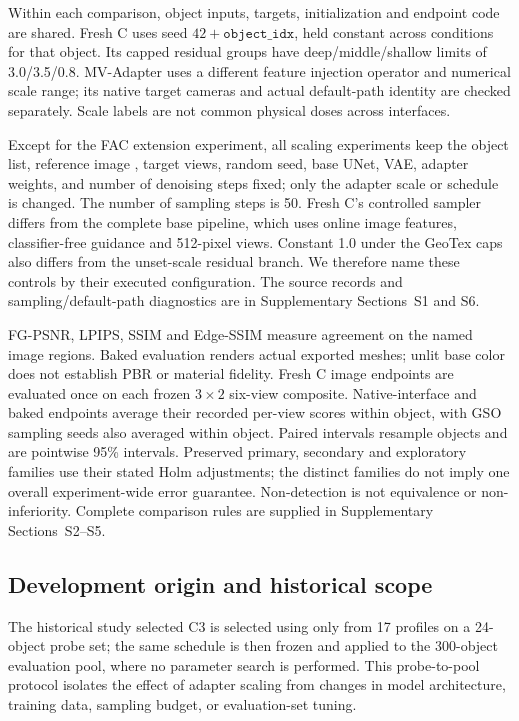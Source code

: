 \documentclass[times,twocolumn,final]{elsarticle}
\providecommand{\DIFadd}[1]{{\protect\color{blue} \sf #1}} %
\providecommand{\DIFdel}[1]{{\protect\color{red} \scriptsize #1}} %
\providecommand{\DIFaddbegin}{} %
\providecommand{\DIFaddend}{} %
\providecommand{\DIFdelbegin}{} %
\providecommand{\DIFdelend}{} %
\begin{document}
\DIFadd{Within each comparison, object inputs, targets, initialization and endpoint code are shared. Fresh C uses seed $42+\texttt{object\_idx}$, held constant across conditions for that object. Its capped residual groups have deep/middle/shallow limits of 3.0/3.5/0.8}\DIFaddend . \DIFaddbegin \DIFadd{MV-Adapter uses a different feature injection operator and numerical scale range; its native target cameras and actual default-path identity are checked separately. Scale labels are not common physical doses across interfaces.
}\DIFaddend 

\DIFdelbegin \DIFdel{Except for the FAC extension experiment, all scaling experiments keep the object list, reference image , target views, random seed, base UNet, VAE, adapter weights, and number of denoising steps fixed; only the adapter scale or schedule is changed. The number of sampling steps is 50. }\DIFdelend \DIFaddbegin \DIFadd{Fresh C's controlled sampler differs from the complete base pipeline, which uses online image features, classifier-free guidance and 512-pixel views. Constant 1.0 under the GeoTex caps also differs from the unset-scale residual branch. We therefore name these controls by their executed configuration. The source records and sampling/default-path diagnostics are in Supplementary Sections~S1 and S6.
}

\DIFadd{FG-PSNR, LPIPS, SSIM and Edge-SSIM measure agreement on the named image regions. Baked evaluation renders actual exported meshes; unlit base color does not establish PBR or material fidelity. Fresh C image endpoints are evaluated once on each frozen $3\times2$ six-view composite. Native-interface and baked endpoints average their recorded per-view scores within object, with GSO sampling seeds also averaged within object. Paired intervals resample objects and are pointwise 95\% intervals. Preserved primary, secondary and exploratory families use their stated Holm adjustments; the distinct families do not imply one overall experiment-wide error guarantee. Non-detection is not equivalence or non-inferiority. Complete comparison rules are supplied in Supplementary Sections~S2--S5.
}

\subsection{Development origin and historical scope}
\label{subsec:c3}
\DIFadd{The historical study selected }\DIFaddend C3 \DIFdelbegin \DIFdel{is selected using only }\DIFdelend \DIFaddbegin \DIFadd{from 17 profiles on }\DIFaddend a 24-object probe \DIFdelbegin \DIFdel{set; the same schedule is then frozen and applied to the 300-object evaluation pool, where no parameter search is performed. This probe-to-pool protocol isolates the effect of adapter scaling from changes in model architecture, training data, sampling budget, or evaluation-set tuning. }%
\end{document}
